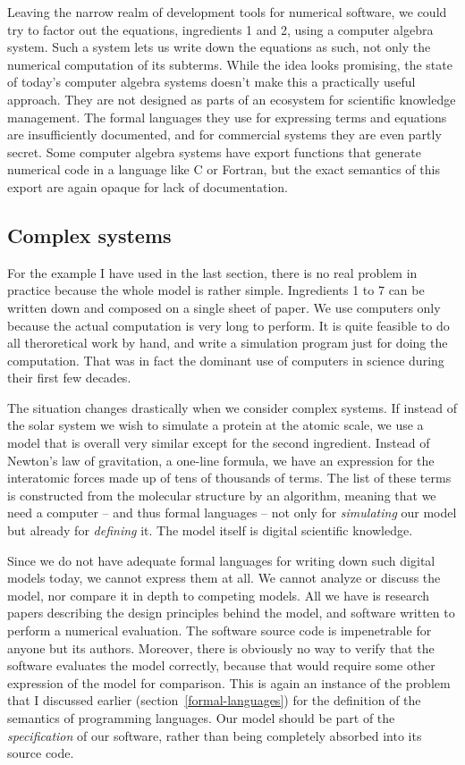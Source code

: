 Leaving the narrow realm of development tools for numerical software, we could try to factor out the equations, ingredients 1 and 2, using a computer algebra system. Such a system lets us write down the equations as such, not only the numerical computation of its subterms. While the idea looks promising, the state of today's computer algebra systems doesn't make this a practically useful approach. They are not designed as parts of an ecosystem for scientific knowledge management. The formal languages they use for expressing terms and equations are insufficiently documented, and for commercial systems they are even partly secret. Some computer algebra systems have export functions that generate numerical code in a language like C or Fortran, but the exact semantics of this export are again opaque for lack of documentation.

\subsection{Complex systems}
\label{complex-systems}

For the example I have used in the last section, there is no real problem in practice because the whole model is rather simple. Ingredients 1 to 7 can be written down and composed on a single sheet of paper. We use computers only because the actual computation is very long to perform. It is quite feasible to do all theroretical work by hand, and write a simulation program just for doing the computation. That was in fact the dominant use of computers in science during their first few decades.

The situation changes drastically when we consider complex systems. If instead of the solar system we wish to simulate a protein at the atomic scale, we use a model that is overall very similar except for the second ingredient. Instead of Newton's law of gravitation, a one-line formula, we have an expression for the interatomic forces made up of tens of thousands of terms. The list of these terms is constructed from the molecular structure by an algorithm, meaning that we need a computer -- and thus formal languages -- not only for \textit{simulating} our model but already for \textit{defining} it. The model itself is digital scientific knowledge.

Since we do not have adequate formal languages for writing down such digital models today, we cannot express them at all. We cannot analyze or discuss the model, nor compare it in depth to competing models. All we have is research papers describing the design principles behind the model, and software written to perform a numerical evaluation. The software source code is impenetrable for anyone but its authors. Moreover, there is obviously no way to verify that the software evaluates the model correctly, because that would require some other expression of the model for comparison. This is again an instance of the problem that I discussed earlier (section~\ref{formal-languages}) for the definition of the semantics of programming languages. Our model should be part of the \textit{specification} of our software, rather than being completely absorbed into its source code.

